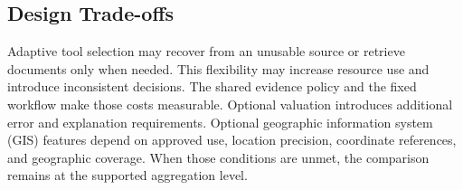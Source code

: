 \subsection{Design Trade-offs}
Adaptive tool selection may recover from an unusable source or retrieve documents only when needed. This flexibility may increase resource use and introduce inconsistent decisions. The shared evidence policy and the fixed workflow make those costs measurable. Optional valuation introduces additional error and explanation requirements. Optional geographic information system (GIS) features depend on approved use, location precision, coordinate references, and geographic coverage. When those conditions are unmet, the comparison remains at the supported aggregation level.
